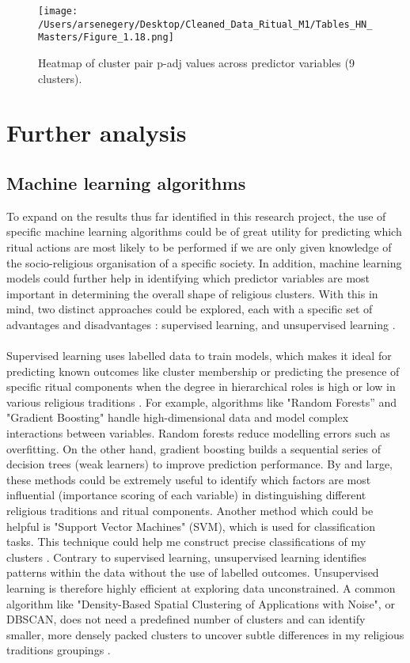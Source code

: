 \documentclass[12pt]{report}
\begin{document}
\begin{figure}[htbp]
	\centering
	\texttt{[image: /Users/arsenegery/Desktop/Cleaned\_Data\_Ritual\_M1/Tables\_HN\_Masters/Figure\_1.18.png]} %
	\caption{Heatmap of cluster pair p-adj values across predictor variables (9 clusters).} 
	\label{fig:table18}
\end{figure}


	\chapter{Further analysis}
	\section{Machine learning algorithms}
	
	To expand on the results thus far identified in this research project, the use of specific machine learning algorithms could be of great utility for predicting which ritual actions are most likely to be performed if we are only given knowledge of the socio-religious organisation of a specific society. In addition, machine learning models could further help in identifying which predictor variables are most important in determining the overall shape of religious clusters. With this in mind, two distinct approaches could be explored, each with a specific set of advantages and disadvantages : supervised learning, and unsupervised learning \cite{goldberg2018}.\\
	\\
	Supervised learning uses labelled data to train models, which makes it ideal for predicting known outcomes like cluster membership or predicting the presence of specific ritual components when the degree in hierarchical roles is high or low in various religious traditions \cite{gao2018}. For example, algorithms like "Random Forests'' \cite{shi2006}\cite{muchlinski2016} and "Gradient Boosting" \cite{buhlmann2006} handle high-dimensional data and model complex interactions between variables. Random forests reduce modelling errors such as overfitting. On the other hand, gradient boosting builds a sequential series of decision trees (weak learners) to improve prediction performance. By and large, these methods could be extremely useful to identify which factors are most influential (importance scoring of each variable) in distinguishing different religious traditions and ritual components. Another method which could be helpful is "Support Vector Machines" (SVM), which is used for classification tasks. This technique could help me construct precise classifications of my clusters \cite{hefner2014}\cite{yuadi2021}. Contrary to supervised learning, unsupervised learning identifies patterns within the data without the use of labelled outcomes. Unsupervised learning is therefore highly efficient at exploring data unconstrained. A common algorithm like "Density-Based Spatial Clustering of Applications with Noise", or DBSCAN, does not need a predefined number of clusters and can identify smaller, more densely packed clusters to uncover subtle differences in my religious traditions groupings \cite{malkic2013}\cite{ramazzotti2018}\cite{schwenker2012}.\\
\end{document}
